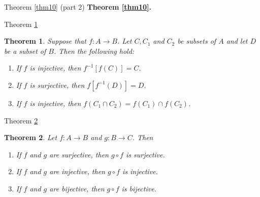 \documentclass[avery5371,grid]{flashcards}
\newtheorem{theorem}{Theorem}
\begin{document}
\begin{flashcard}[Theorem]{Theorem \ref{thm10} (part 2)}
\textbf{Theorem \ref{thm10}.}
\end{flashcard}


\begin{flashcard}[Theorem]{Theorem \ref{thm11}}
\begin{theorem}
\label{thm11}
Suppose that $f: A \to B$.  Let $C, C_1$ and $C_2$ be subsets of $A$ and
let $D$ be a subset of $B$.  Then the following hold:
\begin{enumerate}
\item If $f$ is injective, then $f^{-1}[f(C)]=C$.
\item If $f$ is surjective, then $f[f^{-1}(D)]=D$.
\item If $f$ is injective, then $f(C_1 \cap C_2) = f(C_1) \cap f(C_2)$.
\end{enumerate}
\end{theorem}
\end{flashcard}

\begin{flashcard}[Theorem]{Theorem \ref{thm12}}
\begin{theorem}
\label{thm12}
Let $f: A \to B$ and $g: B \to C$.  Then
\begin{enumerate}
\item If $f$ and $g$ are surjective, then $g \circ f$ is surjective.
\item If $f$ and $g$ are injective, then $g \circ f$ is injective.
\item If $f$ and $g$ are bijective, then $g \circ f$ is bijective.
\end{enumerate}
\end{theorem}
\end{flashcard}
\end{document}
